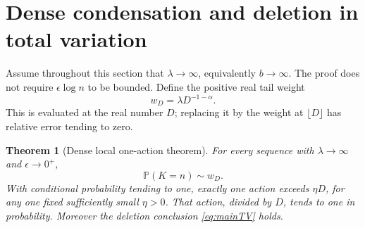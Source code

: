 \documentclass[11pt,a4paper]{article}
\numberwithin{equation}{section}
\newtheorem{theorem}{Theorem}[section]
\theoremstyle{definition}
\theoremstyle{remark}
\newcommand{\Prob}{\mathbb P}
\newcommand{\ee}{\epsilon}
\begin{document}
\section{Dense condensation and deletion in total variation}
\label{sec:dense}
Assume throughout this section that $\lambda\to\infty$, equivalently
$b\to\infty$. The proof does not require $\ee\log n$ to be bounded.
Define the positive real tail weight
\begin{equation}\label{eq:wD}
 w_D=\lambda D^{-1-\alpha}.
\end{equation}
This is evaluated at the real number $D$; replacing it by the weight at
$\lfloor D\rfloor$ has relative error tending to zero.

\begin{theorem}[Dense local one-action theorem]\label{thm:dense}
For every sequence with $\lambda\to\infty$ and $\ee\to0^+$,
\begin{equation}\label{eq:denselocal}
 \Prob(K=n)\sim w_D.
\end{equation}
With conditional probability tending to one, exactly one action exceeds
$\eta D$, for any one fixed sufficiently small $\eta>0$. That action,
divided by $D$, tends to one in probability. Moreover the deletion
conclusion \eqref{eq:mainTV} holds.
\end{theorem}
\end{document}
